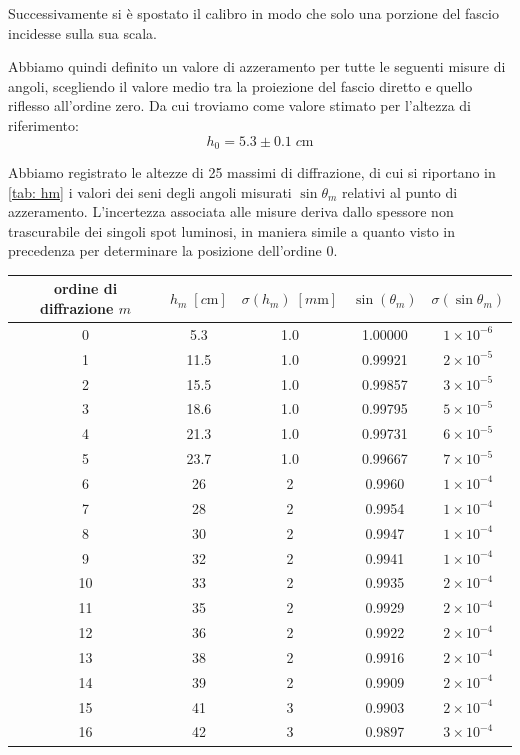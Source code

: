 \documentclass[10pt, a4paper, italian]{article}
\begin{document}
Successivamente si è spostato il calibro in modo che solo una porzione del fascio incidesse sulla sua scala.

Abbiamo quindi definito un valore di azzeramento per tutte le seguenti misure di
angoli, scegliendo il valore medio tra la proiezione del fascio diretto e
quello riflesso all'ordine zero. Da cui troviamo come valore stimato per
l'altezza di riferimento:
\[
h_0 = 5.3 \pm 0.1 \; \si{c\m}
\]

Abbiamo registrato le altezze di 25 massimi di diffrazione, di cui si
riportano in \cref{tab: hm} i valori dei seni degli angoli misurati $\sin{\theta_m}$
relativi al punto di azzeramento. L'incertezza associata alle misure deriva dallo
spessore non trascurabile dei singoli spot luminosi, in maniera simile a quanto
visto in precedenza per determinare la posizione dell'ordine 0.
\begin{table}[htbp]
\centering
\begin{tabular}{ccccc}
\toprule
ordine di diffrazione $m$ & $h_m \; [\si{c\m}]$ &
$\sigma (h_m) \; [\si{m\m}]$ & $\sin(\theta _m)$ & $\sigma(\sin{\theta _m})$ \\
\midrule
\midrule
0  & 5.3 & 1.0 & 1.00000 & $1 \times 10^{-6}$ \\
1  & 11.5 & 1.0 & 0.99921 & $2 \times 10^{-5}$ \\
2  & 15.5 & 1.0 & 0.99857 & $3 \times 10^{-5}$ \\
3  & 18.6 & 1.0 & 0.99795 & $5 \times 10^{-5}$ \\
4  & 21.3 & 1.0 & 0.99731 & $6 \times 10^{-5}$ \\
5  & 23.7 & 1.0 & 0.99667 & $7 \times 10^{-5}$ \\
6  & 26 & 2 & 0.9960 & $1 \times 10^{-4}$ \\
7  & 28 & 2 & 0.9954 & $1 \times 10^{-4}$ \\
8  & 30 & 2 & 0.9947 & $1 \times 10^{-4}$ \\
9  & 32 & 2 & 0.9941 & $1 \times 10^{-4}$ \\
10 & 33 & 2 & 0.9935 & $2 \times 10^{-4}$ \\
11 & 35 & 2 & 0.9929 & $2 \times 10^{-4}$ \\
12 & 36 & 2 & 0.9922 & $2 \times 10^{-4}$ \\
13 & 38 & 2 & 0.9916 & $2 \times 10^{-4}$ \\
14 & 39 & 2 & 0.9909 & $2 \times 10^{-4}$ \\
15 & 41 & 3 & 0.9903 & $2 \times 10^{-4}$ \\
16 & 42 & 3 & 0.9897 & $3 \times 10^{-4}$ \\

\end{tabular}
\end{table}
\end{document}
